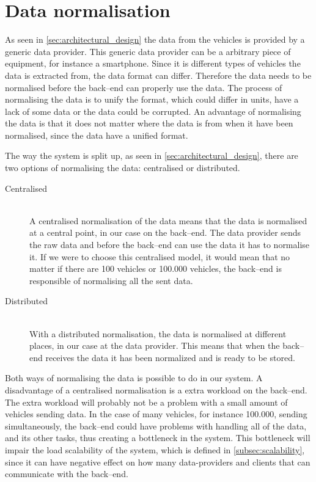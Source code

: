 \section{Data normalisation}\label{sec:data_normalisation}
As seen in \cref{sec:architectural_design} the data from the vehicles is provided by a generic data provider.
This generic data provider can be a arbitrary piece of equipment, for instance a smartphone. 
Since it is different types of vehicles the data is extracted from, the data format can differ.
Therefore the data needs to be normalised before the back--end can properly use the data.
The process of normalising the data is to unify the format, which could differ in units, have a lack of some data or the data could be corrupted.
An advantage of normalising the data is that it does not matter where the data is from when it have been normalised, since the data have a unified format.

The way the system is split up, as seen in \cref{sec:architectural_design}, there are two options of normalising the data: centralised or distributed.

\begin{description}
    \item[Centralised] \hfill \\
    A centralised normalisation of the data means that the data is normalised at a central point, in our case on the back--end.
    The data provider sends the raw data and before the back--end can use the data it has to normalise it.
    If we were to choose this centralised model, it would mean that no matter if there are 100 vehicles or 100.000 vehicles, 
    the back--end is responsible of normalising all the sent data.
    
    \item[Distributed] \hfill \\
    With a distributed normalisation, the data is normalised at different places, in our case at the data provider. 
    This means that when the back--end receives the data it has been normalized and is ready to be stored.
\end{description}
\bigskip

Both ways of normalising the data is possible to do in our system.
A disadvantage of a centralised normalisation is a extra workload on the back--end.
The extra workload will probably not be a problem with a small amount of vehicles sending data.
In the case of many vehicles, for instance 100.000, sending simultaneously, the back--end could have problems with handling all of the data,
and its other tasks, thus creating a bottleneck in the system.
This bottleneck will impair the load scalability of the system, which is defined in \cref{subsec:scalability},
since it can have negative effect on how many data-providers and clients that can communicate with the back--end.


